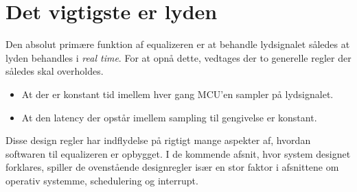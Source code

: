 \section{Det vigtigste er lyden}
Den absolut primære funktion af equalizeren er at behandle lydsignalet således at lyden behandles i \textit{real time}.
For at opnå dette, vedtages der to generelle regler der således skal overholdes.
\begin{itemize}[noitemsep]
\item At der er konstant tid imellem hver gang MCU'en sampler på lydsignalet.
\item At den latency der opstår imellem sampling til gengivelse er konstant.
\end{itemize}

Disse design regler har indflydelse på rigtigt mange aspekter af, hvordan softwaren til equalizeren er opbygget.
I de kommende afsnit, hvor system designet forklares, spiller de ovenstående designregler især en stor faktor i afsnittene om operativ systemme, schedulering og interrupt.





